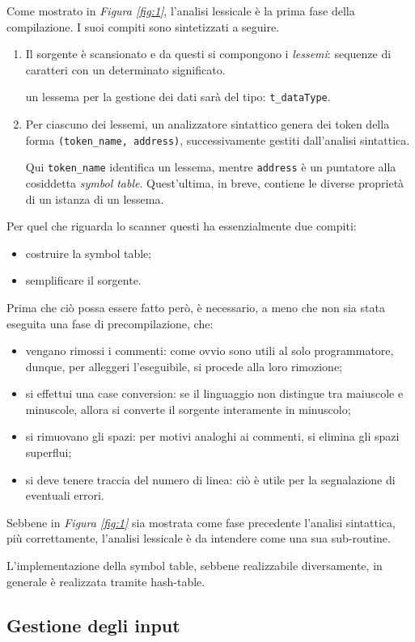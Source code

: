 \documentclass{subfiles}
\begin{document}
Come mostrato in \emph{Figura \ref{fig:1}}, l'analisi lessicale è la prima fase della compilazione.
I suoi compiti sono sintetizzati a seguire.
\begin{enumerate}
    \item Il sorgente è scansionato e da questi si compongono i \emph{lessemi}: sequenze di caratteri con un determinato significato.
          \begin{Example*}
              un lessema per la gestione dei dati sarà del tipo: \lstinline{t_dataType}.
          \end{Example*}

    \item Per ciascuno dei lessemi, un analizzatore sintattico genera dei token della forma \lstinline{(token_name, address)},
          successivamente gestiti dall'analisi sintattica.

          Qui \lstinline{token_name} identifica un lessema, mentre \lstinline{address} è un puntatore alla cosiddetta \emph{symbol table}.
          Quest'ultima, in breve, contiene le diverse proprietà di un istanza di un lessema.
\end{enumerate}

Per quel che riguarda lo scanner questi ha essenzialmente due compiti:
\begin{itemize}
    \item costruire la symbol table;
    \item semplificare il sorgente.
\end{itemize}
Prima che ciò possa essere fatto però, è necessario, a meno che non sia stata eseguita una fase di precompilazione, che:
\begin{itemize}
    \item vengano rimossi i commenti: come ovvio sono utili al solo programmatore, dunque, per alleggeri l'eseguibile, si procede alla loro rimozione;
    \item si effettui una case conversion: se il linguaggio non distingue tra maiuscole e minuscole, allora si converte il sorgente interamente in minuscolo;
    \item si rimuovano gli spazi: per motivi analoghi ai commenti, si elimina gli spazi superflui;
    \item si deve tenere traccia del numero di linea: ciò è utile per la segnalazione di eventuali errori.
\end{itemize}

\begin{MarginNote}
    Sebbene in \emph{Figura \ref{fig:1}} sia mostrata come fase precedente l'analisi sintattica, più correttamente,
    l'analisi lessicale è da intendere come una sua sub-routine.
\end{MarginNote}
L'implementazione della symbol table, sebbene realizzabile diversamente, in generale è realizzata tramite hash-table.

\subsection{Gestione degli input}

\clearpage
\end{document}

